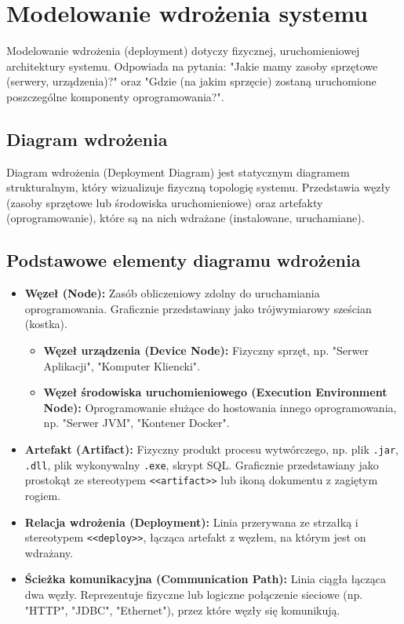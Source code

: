 \documentclass[a4paper,12pt]{article}
\begin{document}
\section{Modelowanie wdrożenia systemu}

Modelowanie wdrożenia (deployment) dotyczy fizycznej, uruchomieniowej architektury systemu. Odpowiada na pytania: "Jakie mamy zasoby sprzętowe (serwery, urządzenia)?" oraz "Gdzie (na jakim sprzęcie) zostaną uruchomione poszczególne komponenty oprogramowania?".

\subsection{Diagram wdrożenia}

Diagram wdrożenia (Deployment Diagram) jest statycznym diagramem strukturalnym, który wizualizuje fizyczną topologię systemu. Przedstawia węzły (zasoby sprzętowe lub środowiska uruchomieniowe) oraz artefakty (oprogramowanie), które są na nich wdrażane (instalowane, uruchamiane).

\subsection{Podstawowe elementy diagramu wdrożenia}
\begin{itemize}
    \item \textbf{Węzeł (Node):} Zasób obliczeniowy zdolny do uruchamiania oprogramowania. Graficznie przedstawiany jako trójwymiarowy sześcian (kostka).
        \begin{itemize}
            \item \textbf{Węzeł urządzenia (Device Node):} Fizyczny sprzęt, np. "Serwer Aplikacji", "Komputer Kliencki".
            \item \textbf{Węzeł środowiska uruchomieniowego (Execution Environment Node):} Oprogramowanie służące do hostowania innego oprogramowania, np. "Serwer JVM", "Kontener Docker".
        \end{itemize}
    \item \textbf{Artefakt (Artifact):} Fizyczny produkt procesu wytwórczego, np. plik \texttt{.jar}, \texttt{.dll}, plik wykonywalny \texttt{.exe}, skrypt SQL. Graficznie przedstawiany jako prostokąt ze stereotypem \texttt{<<artifact>>} lub ikoną dokumentu z zagiętym rogiem.
    \item \textbf{Relacja wdrożenia (Deployment):} Linia przerywana ze strzałką i stereotypem \texttt{<<deploy>>}, łącząca artefakt z węzłem, na którym jest on wdrażany.
    \item \textbf{Ścieżka komunikacyjna (Communication Path):} Linia ciągła łącząca dwa węzły. Reprezentuje fizyczne lub logiczne połączenie sieciowe (np. "HTTP", "JDBC", "Ethernet"), przez które węzły się komunikują.
\end{itemize}
\end{document}
